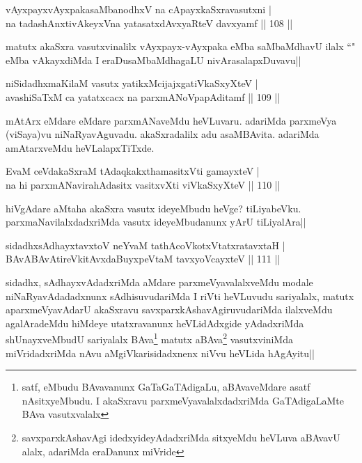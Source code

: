 \begin{shl}
vAyxpayxvAyxpakasaMbanodhxV na cApayxkaSxravasutxni |\\
na tadashAnxtivAkeyxVna yatasatxdAvxyaRteV davxyamf \hfill || 108 ||
\end{shl}

\begin{artha}
matutx akaSxra vasutxvinalilx vAyxpayx-vAyxpaka eMba saMbaMdhavU ilalx ``\stext " eMba vAkayxdiMda I eraDusaMbaMdhagaLU nivArasalapxDuvavu||
\end{artha}

\begin{shl}
niSidadhxmaKilaM vasutx yatikxMcijajxgatiVkaSxyXteV |\\
avashiSaTxM ca yatatxcacx na parxmANoVpapAditamf \hfill || 109 ||
\end{shl}

\begin{artha}%
mAtArx eMdare eMdare parxmANaveMdu heVLuvaru. adariMda parxmeVya (viSaya)vu niNaRyavAguvadu. akaSxradalilx adu asaMBAvita. adariMda amAtarxveMdu heVLalapxTiTxde. 
\end{artha}

\begin{shl}
EvaM ceVdakaSxraM tAdaqkakxthamasitxVti gamayxteV |\\
na hi parxmANavirahAdasitx vasitxvXti viVkaSxyXteV \hfill || 110 ||
\end{shl}

\begin{artha}
hiVgAdare aMtaha akaSxra vasutx ideyeMbudu heVge? tiLiyabeVku. parxmaNavilalxdadxriMda vasutx ideyeMbudanunx yArU tiLiyalAra||
\end{artha}

\begin{shl}
sidadhxsAdhayxtavxtoV neYvaM tathAcoVkotxVtatxratavxtaH |\\
BAvABAvAtireVkitAvxdaBuyxpeVtaM tavxyoVcayxteV \hfill || 111 ||
\end{shl}

\begin{artha}
sidadhx, sAdhayxvAdadxriMda aMdare parxmeVyavalalxveMdu modale niNaRyavAdadadxnunx sAdhisuvudariMda I riVti heVLuvudu sariyalalx, matutx aparxmeVyavAdarU akaSxravu savxparxkAshavAgiruvudariMda ilalxveMdu agalAradeMdu hiMdeye utatxravanunx heVLidAdxgide yAdadxriMda shUnayxveMbudU sariyalalx BAva\footnote[1]{satf, eMbudu BAvavanunx GaTaGaTAdigaLu, aBAvaveMdare asatf nAsitxyeMbudu. I akaSxravu parxmeVyavalalxdadxriMda GaTAdigaLaMte BAva vasutxvalalx} matutx aBAva\footnote[2]{savxparxkAshavAgi idedxyideyAdadxriMda sitxyeMdu heVLuva aBAvavU alalx, adariMda eraDanunx miVride} vasutxviniMda  miVridadxriMda nAvu aMgiVkarisidadxnenx niVvu heVLida hAgAyitu||
\end{artha}%

